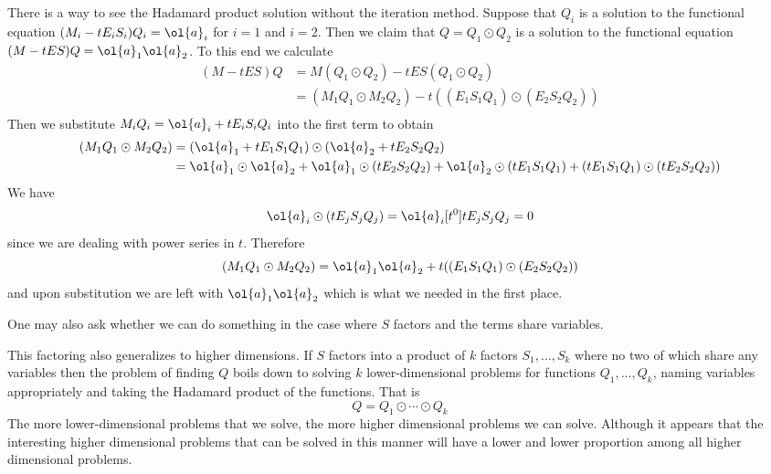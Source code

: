There is a way to see the Hadamard product solution without the iteration method. Suppose that $Q_i$ is a solution to the functional equation $(M_i - tE_iS_i)Q_i = \ol{a}_i$ for $i = 1$ and $i = 2$. Then we claim that $Q = Q_1 \odot Q_2$ is a solution to the functional equation $(M - tES)Q = \ol{a}_1\ol{a}_2$. To this end we calculate
\begin{align*}
	(M-tES)Q &= M (Q_1\odot Q_2) - tES(Q_1\odot Q_2)\\
	& = (M_1Q_1\odot M_2Q_2) - t((E_1S_1Q_1)\odot (E_2S_2Q_2))\\
\end{align*}
Then we substitute $ M_i Q_i = \ol{a}_i + tE_iS_iQ_i$ into the first term to obtain
\begin{align*}
	 (M_1Q_1\odot M_2Q_2) &= (\ol{a}_1+ t E_1 S_1 Q_1)\odot(\ol{a}_2 + t E_2 S_2 Q_2)\\
	 & = \ol{a}_1\odot\ol{a}_2 + \ol{a}_1\odot (t E_2 S_2 Q_2) + \ol{a}_2\odot(t E_1 S_1 Q_1) + (t E_1 S_1 Q_1)\odot(t E_2 S_2 Q_2))
\end{align*}
We have
\[
	\ol{a}_i\odot (t E_j S_j Q_j) = \ol{a}_i [t^0]t E_j S_j Q_j = 0
\]
since we are dealing with power series in $t$. Therefore
\[
	(M_1Q_1\odot M_2Q_2) =  \ol{a}_1\ol{a}_2 +t ((E_1 S_1 Q_1)\odot (E_2 S_2 Q_2))
\]
and upon substitution we are left with $\ol{a}_1\ol{a}_2$ which is what we needed in the first place.

One may also ask whether we can do something in the case where $S$ factors and the terms share variables.

This factoring also generalizes to higher dimensions. If $S$ factors into a product of $k$ factors $S_1,\ldots, S_k$ where no two of which share any variables then the problem of finding $Q$ boils down to solving $k$ lower-dimensional problems for functions $Q_1,\ldots, Q_k$, naming variables appropriately and taking the Hadamard product of the functions. That is
\[
	Q = Q_1 \odot \cdots \odot Q_k
\]
The more lower-dimensional problems that we solve, the more higher dimensional problems we can solve. Although it appears that the interesting higher dimensional problems that can be solved in this manner will have a lower and lower proportion among all higher dimensional problems.
